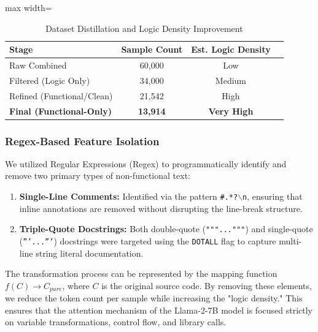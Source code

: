 \begin{table}[H]
\centering
\caption{Dataset Distillation and Logic Density Improvement}
\label{tab:distillation}
\begin{adjustbox}{max width=\textwidth}
\begin{tabular}{lccc}
\toprule
\textbf{Stage} & \textbf{Sample Count} & \textbf{Est. Logic Density} \\ 
\midrule
Raw Combined               & 60,000  & Low \\
Filtered (Logic Only)      & 34,000  & Medium \\
Refined (Functional/Clean) & 21,542   & High \\
\textbf{Final (Functional-Only)} & \textbf{13,914}  & \textbf{Very High} \\ 
\bottomrule
\end{tabular}
\end{adjustbox}
\end{table}

\subsubsection{Regex-Based Feature Isolation}
We utilized Regular Expressions (Regex) to programmatically identify and remove two primary types of non-functional text:
\begin{enumerate}
    \item \textbf{Single-Line Comments:} Identified via the pattern \texttt{\#.*?$\backslash$n}, ensuring that inline annotations are removed without disrupting the line-break structure.
    \item \textbf{Triple-Quote Docstrings:} Both double-quote (\texttt{"""..."""}) and single-quote (\texttt{'''...'''}) docstrings were targeted using the \texttt{DOTALL} flag to capture multi-line string literal documentation.
\end{enumerate}



The transformation process can be represented by the mapping function $f(C) \rightarrow C_{pure}$, where $C$ is the original source code. By removing these elements, we reduce the token count per sample while increasing the "logic density." This ensures that the attention mechanism of the Llama-2-7B model is focused strictly on variable transformations, control flow, and library calls.

